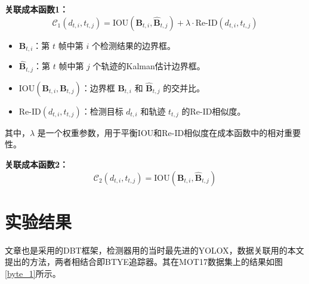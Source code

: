 \begin{tcolorbox}
	\hspace{22pt}\textbf{关联成本函数1：}
	\begin{equation}
		\mathcal{C}_1(d_{t,i}, t_{t,j}) = \text{IOU}(\mathbf{B}_{t,i}, \hat{\mathbf{B}}_{t,j}) + \lambda \cdot \text{Re-ID}(d_{t,i}, t_{t,j})
	\end{equation}
	
	\begin{itemize}
		\item \( \mathbf{B}_{t,i} \)：第 \( t \) 帧中第 \( i \) 个检测结果的边界框。
		\item \( \hat{\mathbf{B}}_{t,j} \)：第 \( t \) 帧中第 \( j \) 个轨迹的Kalman估计边界框。
		\item \( \text{IOU}(\mathbf{B}_{t,i}, \hat{\mathbf{B}}_{t,j}) \)：边界框 \( \mathbf{B}_{t,i} \) 和 \( \hat{\mathbf{B}}_{t,j} \) 的交并比。
		\item \( \text{Re-ID}(d_{t,i}, t_{t,j}) \)：检测目标 \( d_{t,i} \) 和轨迹 \( t_{t,j} \) 的Re-ID相似度。
	\end{itemize}
	
	其中，\( \lambda \) 是一个权重参数，用于平衡IOU和Re-ID相似度在成本函数中的相对重要性。
	
	\hspace{22pt}\textbf{关联成本函数2：}
	\begin{equation}
		\mathcal{C}_2(d_{t,i}, t_{t,j}) = \text{IOU}(\mathbf{B}_{t,i}, \hat{\mathbf{B}}_{t,j})
	\end{equation}
	
\end{tcolorbox}

\section{实验结果}
文章也是采用的DBT框架，检测器用的当时最先进的YOLOX，数据关联用的本文提出的方法，两者相结合即BTYE追踪器。其在MOT17数据集上的结果如图\ref{byte_1}所示。

